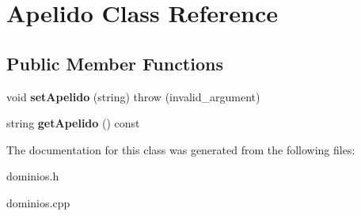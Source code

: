 \hypertarget{classApelido}{}\section{Apelido Class Reference}
\label{classApelido}
\subsection*{Public Member Functions}
\begin{DoxyCompactItemize}
\item 
\mbox{\label{classApelido_a2cb01229e3c1120858ef6c1f692432da}} 
void {\bfseries set\+Apelido} (string)  throw (invalid\+\_\+argument)
\item 
\mbox{\label{classApelido_af3547459a5aff2cd4d6e2befe69ffe12}} 
string {\bfseries get\+Apelido} () const
\end{DoxyCompactItemize}


The documentation for this class was generated from the following files\+:\begin{DoxyCompactItemize}
\item 
dominios.\+h\item 
dominios.\+cpp\end{DoxyCompactItemize}

